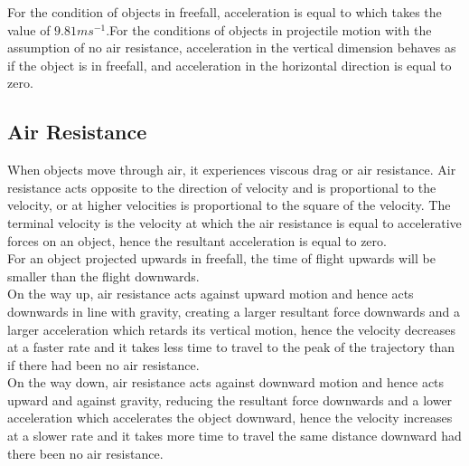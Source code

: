 \documentclass[../main]{subfiles}
\begin{document}
	For the condition of objects in freefall, acceleration is equal to which takes the value of \(9.81 m s^{-1}\).For the conditions of objects in projectile motion with the assumption of no air resistance, acceleration in the vertical dimension behaves as if the object is in freefall, and acceleration in the horizontal direction is equal to zero.

	\subsection{Air Resistance}

	When objects move through air, it experiences viscous drag or air resistance. Air resistance acts opposite to the direction of velocity and is proportional to the velocity, or at higher velocities is proportional to the square of the velocity. The terminal velocity is the velocity at which the air resistance is equal to accelerative forces on an object, hence the resultant acceleration is equal to zero. \\

	For an object projected upwards in freefall, the time of flight upwards will be smaller than the flight downwards. \\

	On the way up, air resistance acts against upward motion and hence acts downwards in line with gravity, creating a larger resultant force downwards and a larger acceleration which retards its vertical motion, hence the velocity decreases at a faster rate and it takes less time to travel to the peak of the trajectory than if there had been no air resistance. \\

	On the way down, air resistance acts against downward motion and hence acts upward and against gravity, reducing the resultant force downwards and a lower acceleration which accelerates the object downward, hence the velocity increases at a slower rate and it takes more time to travel the same distance downward had there been no air resistance.
\end{document}
